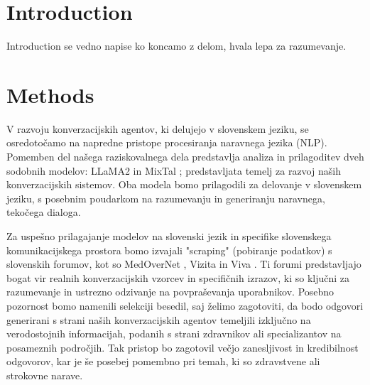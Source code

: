\documentclass[fleqn,moreauthors,10pt]{ds_report}
\affiliation{\textit{Advisor: Slavko Žitnik}}
\begin{document}
\flushbottom 

\maketitle 

\thispagestyle{empty} 


\section*{Introduction}
Introduction se vedno napise ko koncamo z delom, hvala lepa za razumevanje.


\section*{Methods}
V razvoju konverzacijskih agentov, ki delujejo v slovenskem jeziku, se osredotočamo na napredne pristope procesiranja naravnega jezika (NLP). Pomemben del našega raziskovalnega dela predstavlja analiza in prilagoditev dveh sodobnih modelov: LLaMA2 \cite{touvron2023llama} in MixTal \cite{jiang2024mixtral}; predstavljata temelj za razvoj naših konverzacijskih sistemov. Oba modela bomo prilagodili za delovanje v slovenskem jeziku, s posebnim poudarkom na razumevanju in generiranju naravnega, tekočega dialoga.

Za uspešno prilagajanje modelov na slovenski jezik in specifike slovenskega komunikacijskega prostora bomo izvajali "scraping" (pobiranje podatkov) s slovenskih forumov, kot so MedOverNet \cite{medovernet}, Vizita \cite{vizita} in Viva \cite{viva}. Ti forumi predstavljajo bogat vir realnih konverzacijskih vzorcev in specifičnih izrazov, ki so ključni za razumevanje in ustrezno odzivanje na povpraševanja uporabnikov. Posebno pozornost bomo namenili selekciji besedil, saj želimo zagotoviti, da bodo odgovori generirani s strani naših konverzacijskih agentov temeljili izključno na verodostojnih informacijah, podanih s strani zdravnikov ali specializantov na posameznih področjih. Tak pristop bo zagotovil večjo zanesljivost in kredibilnost odgovorov, kar je še posebej pomembno pri temah, ki so zdravstvene ali strokovne narave.
\end{document}
